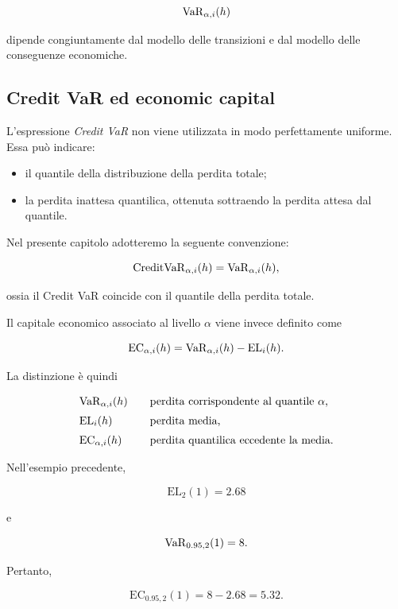 \[
\operatorname{VaR}_{\alpha,i}(h)
\]

dipende congiuntamente dal modello delle transizioni e dal modello
delle conseguenze economiche.

\subsection{Credit VaR ed economic capital}

\label{subsec:cap9-credit-var-capitale}

L'espressione \emph{Credit VaR} non viene utilizzata in modo
perfettamente uniforme. Essa pu\`{o} indicare:

\begin{itemize}

\item il quantile della distribuzione della perdita totale;

\item la perdita inattesa quantilica, ottenuta sottraendo la perdita
attesa dal quantile.

\end{itemize}

Nel presente capitolo adotteremo la seguente convenzione:

\[
\mathrm{CreditVaR}_{\alpha,i}(h)
=
\operatorname{VaR}_{\alpha,i}(h),
\]

ossia il Credit VaR coincide con il quantile della perdita totale.

Il capitale economico associato al livello $\alpha$ viene invece
definito come

\[
\mathrm{EC}_{\alpha,i}(h)
=
\operatorname{VaR}_{\alpha,i}(h)
-
\mathrm{EL}_i(h).
\]

La distinzione \`{e} quindi

\[
\begin{array}{lll}
\operatorname{VaR}_{\alpha,i}(h)
&
&
\text{perdita corrispondente al quantile $\alpha$,}
\\[2mm]
\mathrm{EL}_i(h)
&
&
\text{perdita media,}
\\[2mm]
\mathrm{EC}_{\alpha,i}(h)
&
&
\text{perdita quantilica eccedente la media.}
\end{array}
\]

Nell'esempio precedente,

\[
\mathrm{EL}_2(1)=2.68
\]

e

\[
\operatorname{VaR}_{0.95,2}(1)=8.
\]

Pertanto,

\[
\mathrm{EC}_{0.95,2}(1)
=
8-2.68
=
5.32.
\]

